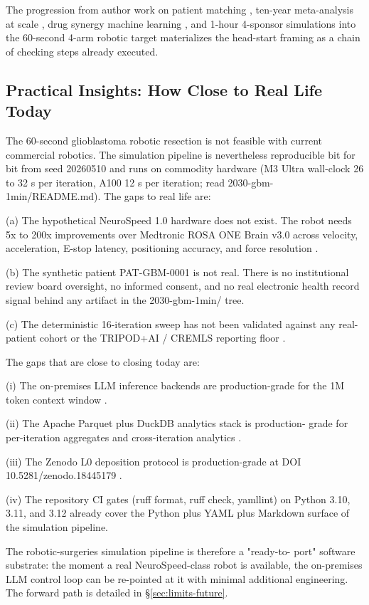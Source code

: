 The progression from author work on patient matching
\cite{kawchak_2025_17774560}, ten-year meta-analysis at scale
\cite{kawchak_2025_15549831}, drug synergy machine learning
\cite{kawchak_2025_17614396}, and 1-hour 4-sponsor simulations
\cite{kawchak_2026_19994945} into the 60-second 4-arm robotic target
\cite{repo-robotic-surgeries, one-minute-variant-instructions}
materializes the head-start framing as a chain of checking steps
already executed.

\subsection{Practical Insights: How Close to Real Life Today}
\label{sec:discussion-practical}

The 60-second glioblastoma robotic resection is not feasible with
current commercial robotics. The simulation pipeline is nevertheless
reproducible bit for bit from seed 20260510 and runs on commodity
hardware (M3 Ultra wall-clock 26 to 32 s per iteration, A100 12 s
per iteration; read 2030-gbm-1min/README.md). The gaps to real life
are:

(a) The hypothetical NeuroSpeed 1.0 hardware does not exist. The
robot needs 5x to 200x improvements over Medtronic ROSA ONE Brain
v3.0 across velocity, acceleration, E-stop latency, positioning
accuracy, and force resolution \cite{rosa-one-brain}.

(b) The synthetic patient PAT-GBM-0001 is not real. There is no
institutional review board oversight, no informed consent, and no
real electronic health record signal behind any artifact in the
2030-gbm-1min/ tree.

(c) The deterministic 16-iteration sweep has not been validated
against any real-patient cohort or the TRIPOD+AI / CREMLS reporting
floor \cite{Collins2024TRIPODAI, ElEmam2024CREMLS}.

The gaps that are close to closing today are:

(i) The on-premises LLM inference backends are production-grade for
the 1M token context window \cite{ollama, vllm, claude-opus-47}.

(ii) The Apache Parquet plus DuckDB analytics stack is production-
grade for per-iteration aggregates and cross-iteration analytics
\cite{apache-arrow, duckdb}.

(iii) The Zenodo L0 deposition protocol is production-grade at DOI
10.5281/zenodo.18445179 \cite{zenodo, repo-robotic-surgeries}.

(iv) The repository CI gates (ruff format, ruff check, yamllint) on
Python 3.10, 3.11, and 3.12 already cover the Python plus YAML plus
Markdown surface of the simulation pipeline.

The robotic-surgeries simulation pipeline is therefore a "ready-to-
port" software substrate: the moment a real NeuroSpeed-class robot
is available, the on-premises LLM control loop can be re-pointed at
it with minimal additional engineering. The forward path is detailed
in \S\ref{sec:limits-future}.
